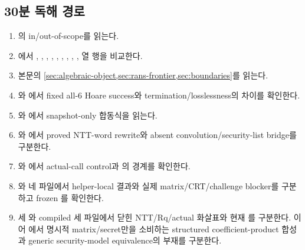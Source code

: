 \subsection{30분 독해 경로}

\begin{enumerate}
  \item {}의 in/out-of-scope를 읽는다.
  \item {}에서
        ,
        ,
        ,
        ,
        ,
        ,
        ,
        ,
        ,
         열 행을 비교한다.
  \item 본문의 \cref{sec:algebraic-object,sec:rans-frontier,sec:boundaries}를 읽는다.
  \item {}와
        에서 fixed all-6 Hoare
        success와 termination/losslessness의 차이를 확인한다.
  \item {}와
        에서 snapshot-only 합동식을 읽는다.
  \item {}와
        에서 proved NTT-word rewrite와
        absent convolution/security-list bridge를 구분한다.
  \item {}와
        에서 actual-call control과
        의 
        \statuspartial 경계를 확인한다.
  \item {}와 네
         파일에서 helper-local 결과와 실제
        matrix/CRT/challenge blocker를 구분하고 frozen \FrozenPaperGate 를 확인한다.
  \item 세 와 compiled 세
         파일에서 닫힌 NTT/Rq/actual
         화살표와 현재 \CurrentGate 를 구분한다.
        이어 에서 명시적 matrix/secret만을
        소비하는 structured coefficient-product 합성과 generic security-model
        equivalence의 부재를 구분한다.
\end{enumerate}

